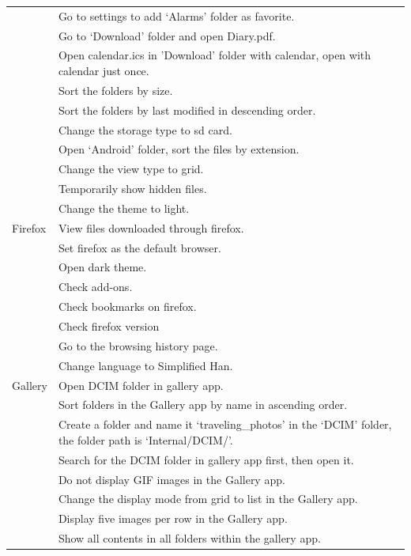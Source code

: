 \begin{longtable}{|p{1.8cm}|p{10.5cm}|}
            & Go to settings to add `Alarms' folder as favorite. \\
            & Go to `Download' folder and open Diary.pdf. \\
            & Open calendar.ics in 'Download' folder with calendar, open with calendar just once. \\
            & Sort the folders by size. \\
            & Sort the folders by last modified in descending order. \\
            & Change the storage type to sd card. \\
            & Open `Android' folder, sort the files by extension. \\
            & Change the view type to grid. \\
            \hline
            & Temporarily show hidden files. \\
            & Change the theme to light. \\
\hline
Firefox & View files downloaded through firefox. \\
        & Set firefox as the default browser. \\
        & Open dark theme. \\
        & Check add-ons. \\
        & Check bookmarks on firefox. \\
        & Check firefox version \\
        & Go to the browsing history page. \\
        & Change language to Simplified Han. \\
\hline
Gallery & Open DCIM folder in gallery app. \\
        & Sort folders in the Gallery app by name in ascending order. \\
        & Create a folder and name it `traveling\_photos' in the `DCIM' folder, the folder path is `Internal/DCIM/'. \\
        & Search for the DCIM folder in gallery app first, then open it. \\
        & Do not display GIF images in the Gallery app. \\
        & Change the display mode from grid to list in the Gallery app. \\
        & Display five images per row in the Gallery app. \\
        & Show all contents in all folders within the gallery app. \\

\end{longtable}
